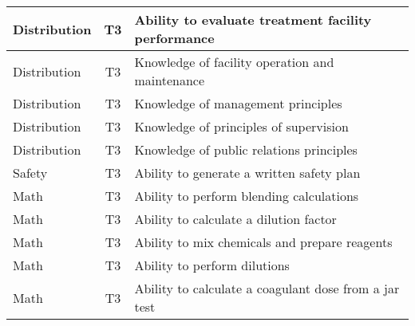 \documentclass{article}
\begin{document}
\begin{table}[]
\begin{tabular}{|l|c|l|}
Distribution                           & T3             & Ability to evaluate   treatment facility performance                                                                              \\ \hline
Distribution                           & T3             & Knowledge of facility   operation and maintenance                                                                                 \\ \hline
Distribution                           & T3             & Knowledge of   management principles                                                                                              \\ \hline
Distribution                           & T3             & Knowledge of   principles of supervision                                                                                          \\ \hline
Distribution                           & T3             & Knowledge of public   relations principles                                                                                        \\ \hline
Safety                                 & T3             & Ability to generate a   written safety plan                                                                                       \\ \hline
Math                                   & T3             & Ability to perform   blending calculations                                                                                        \\ \hline
Math                                   & T3             & Ability to calculate   a dilution factor                                                                                          \\ \hline
Math                                   & T3             & Ability to mix   chemicals and prepare reagents                                                                                   \\ \hline
Math                                   & T3             & Ability to perform   dilutions                                                                                                    \\ \hline
Math                                   & T3             & Ability to calculate   a coagulant dose from a jar test                                                                           \\ \hline

\end{tabular}
\end{table}
\end{document}
